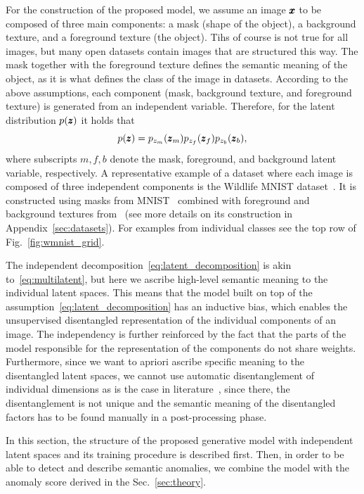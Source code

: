 For the construction of the proposed model, we assume an image $\pmb{{x}}$ to be composed of three main components: a mask (shape of the object), a background texture, and a foreground texture (the object). Tihs of course is not true for all images, but many open datasets contain images that are structured this way. The mask together with the foreground texture defines the semantic meaning of the object, as it is what defines the class of the image in datasets. According to the above assumptions, each component (mask, background texture, and foreground texture) is generated from an independent variable. Therefore, for the latent distribution $p(\pmb{{z}})$ it holds that
\begin{equation} \label{eq:latent_decomposition}
     p(\pmb{{z}}) = p_{z_{m}}(\pmb{{z}}_{m})p_{z_{f}}(\pmb{{z}}_{f})p_{z_b}(\pmb{{z}}_{b}),
\end{equation}
where subscripts $m,f,b$ denote the mask, foreground, and background latent variable, respectively. 
A representative example of a dataset where each image is composed of three independent components is the Wildlife MNIST dataset~\cite{sauer2021counterfactual}. It is constructed using masks from MNIST~\cite{lecun2010mnist} combined with foreground and background textures from~\cite{cimpoi2014describing} (see more details on its construction in Appendix~\ref{sec:datasets}). For examples from individual classes see the top row of Fig.~\ref{fig:wmnist_grid}. 

The independent decomposition~\eqref{eq:latent_decomposition} is akin to~\eqref{eq:multilatent}, but here we ascribe high-level semantic meaning to the individual latent spaces. This means that the model built on top of the assumption~\eqref{eq:latent_decomposition} has an inductive bias, which enables the unsupervised disentangled representation of the individual components of an image. The independency is further reinforced by the fact that the parts of the model responsible for the representation of the components do not share weights. Furthermore, since we want to apriori ascribe specific meaning to the disentangled latent spaces, we cannot use automatic disentanglement of individual dimensions as is the case in literature~\cite{burgess2018understanding, kim2019bayes, deecke2021transfer}, since there, the disentanglement is not unique and the semantic meaning of the disentangled factors has to be found manually in a post-processing phase.

In this section, the structure of the proposed generative model with independent latent spaces and its training procedure is described first. Then, in order to be able to detect and describe semantic anomalies, we combine the model with the anomaly score derived in the Sec.~\ref{sec:theory}.

